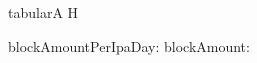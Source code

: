 \documentclass{report}
\begin{document}
\begin{table}[]
\begin{Timetable}{tabular}{A H}

\end{Timetable}
\end{table}
blockAmountPerIpaDay: \blockAmountPerIpaDay
blockAmount: \blockAmount
\end{document}
